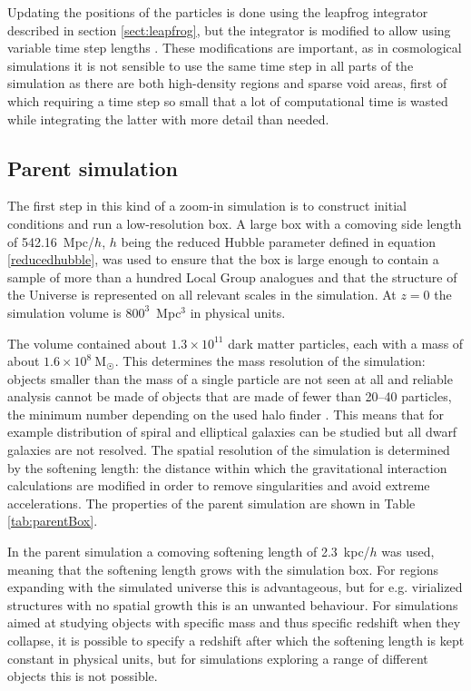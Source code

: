 \documentclass[english, oneside]{HYgradu}
\begin{document}
Updating the positions of the particles is done using the leapfrog integrator described in section \ref{sect:leapfrog}, but the integrator is modified to allow using variable time step lengths \citep{springel2005cosmological}. These modifications are important, as in cosmological simulations it is not sensible to use the same time step in all parts of the simulation as there are both high-density regions and sparse void areas, first of which requiring a time step so small that a lot of computational time is wasted while integrating the latter with more detail than needed.

\subsection{Parent simulation}
The first step in this kind of a zoom-in simulation is to construct initial conditions and run a low-resolution box. A large box with a comoving side length of 542.16~Mpc/$h$, $h$ being the reduced Hubble parameter defined in equation \ref{reducedhubble}, was used to ensure that the box is large enough to contain a sample of more than a hundred Local Group analogues and that the structure of the Universe is represented on all relevant scales in the simulation. At $z = 0$ the simulation volume is $800^3$~Mpc$^3$ in physical units.

The volume contained about $1.3 \times 10^{11}$ dark matter particles, each with a mass of about $1.6 \times 10^8~\mathrm{M_{\astrosun}}$. This determines the mass resolution of the simulation: objects smaller than the mass of a single particle are not seen at all and reliable analysis cannot be made of objects that are made of fewer than 20--40 particles, the minimum number depending on the used halo finder \citep{knebe2011haloes}. This means that for example distribution of spiral and elliptical galaxies can be studied but all dwarf galaxies are not resolved. The spatial resolution of the simulation is determined by the softening length: the distance within which the gravitational interaction calculations are modified in order to remove singularities and avoid extreme accelerations. The properties of the parent simulation are shown in Table \ref{tab:parentBox}.

In the parent simulation a comoving softening length of 2.3~kpc/$h$ was used, meaning that the softening length grows with the simulation box. For regions expanding with the simulated universe this is advantageous, but for e.g. virialized structures with no spatial growth this is an unwanted behaviour. For simulations aimed at studying objects with specific mass and thus specific redshift when they collapse, it is possible to specify a redshift after which the softening length is kept constant in physical units, but for simulations exploring a range of different objects this is not possible.
\end{document}
